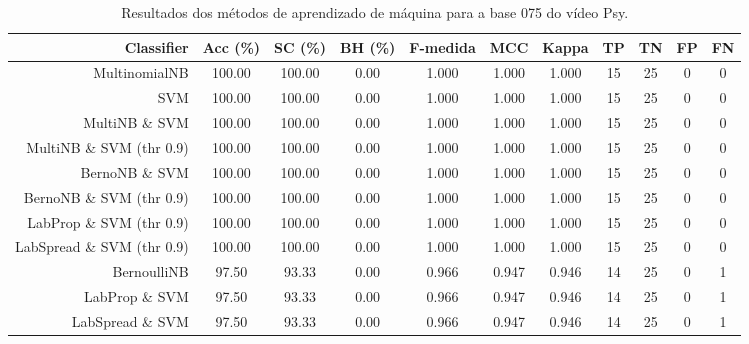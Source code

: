\begin{table}[!htb]
\centering
\caption{Resultados dos métodos de aprendizado de máquina para a base 075 do vídeo Psy.}
\label{tab:Psy-075}
\begin{tabular}{r|c|c|c|c|c|c|c|c|c|c}
\hline\hline
Classifier & Acc (\%) & SC (\%) & BH (\%) & F-medida & MCC & Kappa & TP & TN & FP & FN \\ \hline
MultinomialNB & 100.00 & 100.00 & 0.00 & 1.000 & 1.000 & 1.000 & 15 & 25 & 0 & 0 \\ 
SVM & 100.00 & 100.00 & 0.00 & 1.000 & 1.000 & 1.000 & 15 & 25 & 0 & 0 \\ 
MultiNB \& SVM & 100.00 & 100.00 & 0.00 & 1.000 & 1.000 & 1.000 & 15 & 25 & 0 & 0 \\ 
MultiNB \& SVM (thr 0.9) & 100.00 & 100.00 & 0.00 & 1.000 & 1.000 & 1.000 & 15 & 25 & 0 & 0 \\ 
BernoNB \& SVM & 100.00 & 100.00 & 0.00 & 1.000 & 1.000 & 1.000 & 15 & 25 & 0 & 0 \\ 
BernoNB \& SVM (thr 0.9) & 100.00 & 100.00 & 0.00 & 1.000 & 1.000 & 1.000 & 15 & 25 & 0 & 0 \\ 
LabProp \& SVM (thr 0.9) & 100.00 & 100.00 & 0.00 & 1.000 & 1.000 & 1.000 & 15 & 25 & 0 & 0 \\ 
LabSpread \& SVM (thr 0.9) & 100.00 & 100.00 & 0.00 & 1.000 & 1.000 & 1.000 & 15 & 25 & 0 & 0 \\ 
BernoulliNB & 97.50 & 93.33 & 0.00 & 0.966 & 0.947 & 0.946 & 14 & 25 & 0 & 1 \\ 
LabProp \& SVM & 97.50 & 93.33 & 0.00 & 0.966 & 0.947 & 0.946 & 14 & 25 & 0 & 1 \\ 
LabSpread \& SVM & 97.50 & 93.33 & 0.00 & 0.966 & 0.947 & 0.946 & 14 & 25 & 0 & 1 \\ 
\hline\hline
\end{tabular}
\end{table}
